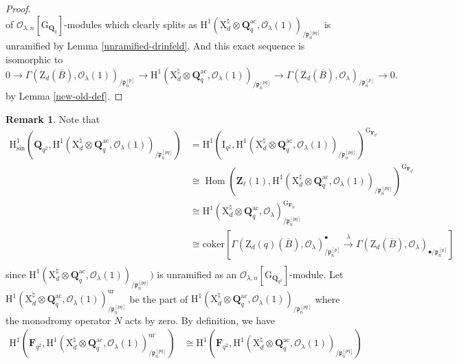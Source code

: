 \documentclass[10pt]{amsart}
\newcommand*\Z{\mathds{Z}}
\newcommand*\ZZ{|[draw,circle]| \Z_2}
\numberwithin{equation}{section}
\theoremstyle{plain}
\numberwithin{equation}{section}
\theoremstyle{definition}
\newtheorem{remark}[equation]{Remark}
\theoremstyle{remark}
\def\coker{\mathrm{coker}}
\def\ac{\mathrm{ac}}
\def\ur{\mathrm{ur}}
\def\ac{\mathrm{ac}}
\DeclareMathOperator{\Hom}{Hom}
\def\calO{\mathcal{O}}
\def\frakp{\mathfrak{p}}
\def\FF{\mathbf{F}}
\def\QQ{\mathbf{Q}}
\def\ZZ{\mathbf{Z}}
\def\rmG{\mathrm{G}}
\def\rmH{\mathrm{H}}
\def\rmI{\mathrm{I}}
\def\rmX{\mathrm{X}}
\def\rmZ{\mathrm{Z}}
\begin{document}
\begin{proof}
\begin{equation*}
\end{equation*}
of $\calO_{\lambda, n}[\rmG_{\QQ_{q}}]$-modules which clearly splits as $\rmH^{1}(\rmX^{\natural}_{d}\otimes{\QQ^{\ac}_{q}}, \calO_{\lambda}(1))_{/\frakp^{[pq]}_{n}}$ is unramified by Lemma \ref{unramified-drinfeld}. And this exact sequence is isomorphic to 
\begin{equation*}
0\rightarrow \Gamma(\rmZ_{d}(\overline{B}), \calO_{\lambda}(1))_{/\frakp^{[p]}_{n}}\rightarrow \rmH^{1}(\rmX^{\natural}_{d}\otimes{\QQ^{\ac}_{q}}, \calO_{\lambda}(1))_{/\frakp^{[pq]}_{n}}\rightarrow \Gamma(\rmZ_{d}(\overline{B}), \calO_{\lambda})_{/\frakp^{[p]}_{n}}\rightarrow 0.
\end{equation*} 
by Lemma \ref{new-old-def}.
\end{proof}
\begin{remark}
Note that
\begin{equation*}
\begin{aligned}
\rmH^{1}_{\sin}(\QQ_{q^{2}}, \rmH^{1}(\rmX^{\natural}_{d}\otimes{\QQ^{\ac}_{q}}, \calO_{\lambda}(1))_{/\frakp^{[pq]}_{n}})&=\rmH^{1}(\rmI_{q^{2}}, \rmH^{1}(\rmX^{\natural}_{d}\otimes{\QQ^{\ac}_{q}}, \calO_{\lambda}(1))_{/\frakp^{[pq]}_{n}})^{\rmG_{\FF_{q^{2}}}}\\
&\cong \Hom(\ZZ_{\ell}(1), \rmH^{1}(\rmX^{\natural}_{d}\otimes{\QQ^{\ac}_{q}}, \calO_{\lambda}(1))_{/\frakp^{[pq]}_{n}})^{\rmG_{\FF_{q^{2}}}}\\
&\cong  \rmH^{1}(\rmX^{\natural}_{d}\otimes{\QQ^{\ac}_{q}}, \calO_{\lambda})^{\rmG_{\FF_{q^{2}}}}_{/\frakp^{[pq]}_{n}}\\
&\cong \coker[\Gamma(\rmZ_{d}(q)(\overline{B}), \calO_{\lambda})^{\bullet}_{/\frakp^{[p]}_{n}}\xrightarrow{\lambda}\Gamma(\rmZ_{d}(\overline{B}), \calO_{\lambda})_{\bullet/\frakp^{[p]}_{n}}]\\
\end{aligned}
\end{equation*}
since $\rmH^{1}(\rmX^{\natural}_{d}\otimes{\QQ^{\ac}_{q}}, \calO_{\lambda}(1))_{/\frakp^{[pq]}_{n}})$ is unramified as an $\calO_{\lambda, n}[\rmG_{\QQ_{q^{2}}}]$-module.
Let $\rmH^{1}(\rmX^{\natural}_{d}\otimes{\QQ^{\ac}_{q}}, \calO_{\lambda}(1))^{\ur}_{/\frakp^{[pq]}_{n}}$ be the part of $\rmH^{1}(\rmX^{\natural}_{d}\otimes{\QQ^{\ac}_{q}}, \calO_{\lambda}(1))_{/\frakp^{[pq]}_{n}}$ where the monodromy operator $N$ acts by zero. By definition, we have
\begin{equation*}
\begin{aligned}
\rmH^{1}(\FF_{q^{2}}, \rmH^{1}(\rmX^{\natural}_{d}\otimes{\QQ^{\ac}_{q}}, \calO_{\lambda}(1))^{\ur}_{/\frakp^{[pq]}_{n}})&\cong \rmH^{1}(\FF_{q^{2}}, \rmH^{1}(\rmX^{\natural}_{d}\otimes{\QQ^{\ac}_{q}}, \calO_{\lambda}(1))_{/\frakp^{[pq]}_{n}})\\

\end{aligned}
\end{equation*}
\end{remark}
\end{document}
